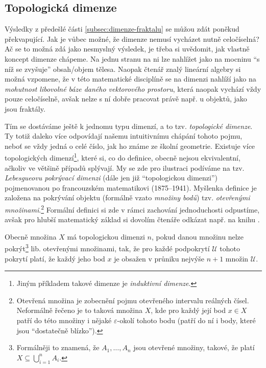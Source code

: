\subsection{Topologická dimenze}\label{subsec:topologicka-dimenze}

Výsledky z předešlé části \ref{subsec:dimenze-fraktalu} se můžou zdát poněkud překvapující. Jak je vůbec možné, že dimenze nemusí vycházet nutně celočíselná? Ač se to možná zdá jako nesmyslný výsledek, je třeba si uvědomit, jak vlastně koncept dimenze chápeme. Na jednu stranu na ni lze nahlížet jako na mocninu ``s níž se zvyšuje'' obsah/objem tělesa. Naopak čtenář znalý lineární algebry si možná vzpomene, že v této matematické disciplíně se na dimenzi nahlíží jako na \emph{mohutnost libovolné báze daného vektorového prostoru}, která naopak vychází vždy pouze celočíselně, avšak nelze s ní dobře pracovat právě např. u objektů, jako jsou fraktály. 

Tím se dostáváme ještě k jednomu typu dimenzí, a to tzv. \emph{topologické dimenze}. Ty totiž daleko více odpovídají našemu intuitivnímu chápání tohoto pojmu, neboť se vždy jedná o celé číslo, jak ho známe ze školní geometrie. Existuje více topologických dimenzí\footnote{Jiným příkladem takové dimenze je \emph{induktivní dimenze}.}, které si, co do definice, obecně nejsou ekvivalentní, ačkoliv ve většině případů splývají. My se zde pro ilustraci podíváme na tzv. \emph{Lebesgueovu pokrývací dimenzi} (dále jen již ``topologickou dimenzi'') pojmenovanou po francouzském matematikovi  (1875--1941). Myšlenka definice je založena na pokrývání objektu (formálně vzato \emph{množiny bodů}) tzv. \emph{otevřenými množinami}.\footnote{Otevřená množina je zobecnění pojmu otevřeného intervalu reálných čísel. Neformálně řečeno je to taková množina $X$, kde pro každý její bod $x\in X$ patří do této množiny i nějaké $\varepsilon$-okolí tohoto bodu (patří do ní i body, které jsou ``dostatečně blízko'').} Formální definici si zde v rámci zachování jednoduchosti odpustíme, avšak pro hlubší matematický základ si dovolím čtenáře odkázat např. na knihu .

Obecně množina $X$ má topologickou dimenzi $n$, pokud danou množinu nelze pokrýt\footnote{Formálněji to znamená, že $A_1,\dots,A_n$ jsou otevřené množiny, takové, že platí $X\subseteq\bigcup_{i=1}^n{A_i}$.} lib. otevřenými množinami, tak, že pro každé podpokrytí $\mathcal{U}$  tohoto pokrytí platí, že každý jeho bod $x$ je obsažen v průniku nejvýše $n+1$ množin $\mathcal{U}$.

